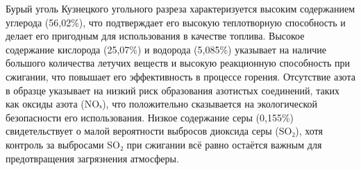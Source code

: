 
Бурый уголь Кузнецкого угольного разреза характеризуется высоким
содержанием углерода (56,02\%), что подтверждает его высокую
теплотворную способность и делает его пригодным для использования в
качестве топлива. Высокое содержание кислорода (25,07\%) и водорода
(5,085\%) указывает на наличие большого количества летучих веществ и
высокую реакционную способность при сжигании, что повышает его
эффективность в процессе горения. Отсутствие азота в образце указывает
на низкий риск образования азотистых соединений, таких как оксиды азота
(NOₓ), что положительно сказывается на экологической безопасности его
использования. Низкое содержание серы (0,155\%) свидетельствует о малой
вероятности выбросов диоксида серы (SO₂), хотя контроль за выбросами SO₂
при сжигании всё равно остаётся важным для предотвращения загрязнения
атмосферы.

